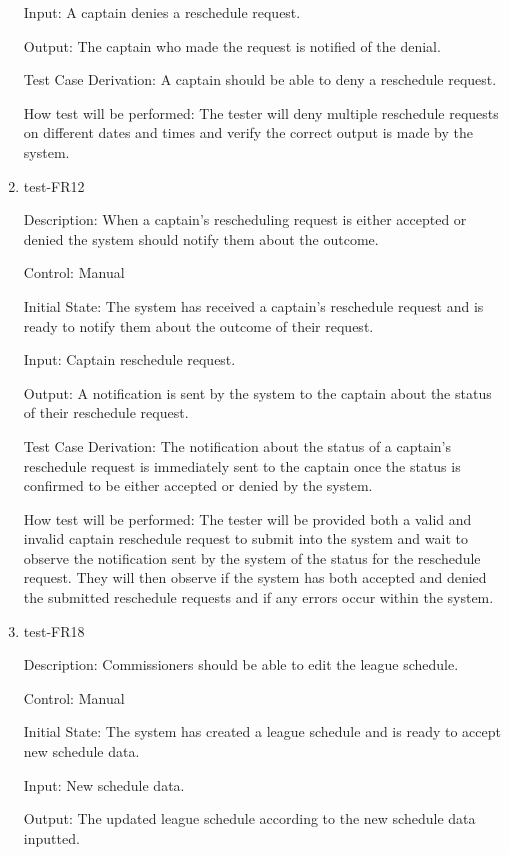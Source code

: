 \documentclass[12pt, titlepage]{article}
\begin{document}
\begin{enumerate}
  Input: A captain denies a reschedule request.

  Output: The captain who made the request is notified of the denial.

  Test Case Derivation: A captain should be able to deny a reschedule
  request.

  How test will be performed: The tester will deny multiple reschedule
  requests on different dates and times and verify the correct output is made by
  the system.

  \item{test-FR12\\}
  
  Description: When a captain’s rescheduling request is either
  accepted or denied the system should notify them about
  the outcome.

  Control: Manual

  Initial State: The system has received a captain's reschedule request and is ready to
  notify them about the outcome of their request.

  Input: Captain reschedule request.

  Output: A notification is sent by the system to the captain about the status of their
  reschedule request.

  Test Case Derivation: The notification about the status of a captain's reschedule
  request is immediately sent to the captain once the status is confirmed to be either
  accepted or denied by the system.

  How test will be performed: The tester will be provided both a valid and invalid captain
  reschedule request to submit into the system and wait to observe the notification sent
  by the system of the status for the reschedule request. They will then observe if the
  system has both accepted and denied the submitted reschedule requests and if any errors
  occur within the system. 

  \item{test-FR18\\}
  
  Description: Commissioners should be able to edit the league
  schedule.

  Control: Manual

  Initial State: The system has created a league schedule and is ready to
  accept new schedule data.

  Input: New schedule data.

  Output: The updated league schedule according to the new schedule data inputted.


\end{enumerate}
\end{document}
